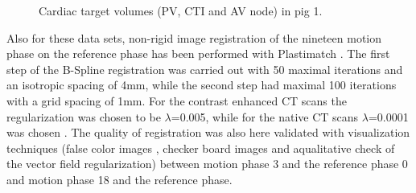 \newpage

 \begin{figure}[H]
 \begin{center}
\caption{Cardiac target volumes (PV, CTI and AV node) in pig 1. }
\label{pig1_targets}
 \end{center}
\end{figure}

\vspace*{-0.7cm}

Also for these data sets, non-rigid image registration of the nineteen motion phase on the reference phase has been performed with Plastimatch 
\cite{Sharp07, Shack10}. The first step of the B-Spline registration was carried out with 50 maximal iterations and an isotropic 
spacing of 4mm, while the second step had maximal 100 iterations with a grid spacing of 1mm. For the contrast enhanced CT scans the 
regularization was chosen to be $\lambda$=0.005, while for the native CT scans $\lambda$=0.0001 was chosen . 
The quality of registration was also here validated with visualization techniques (false color images \cite{Bro07}, checker board images 
\cite{Bro07} and aqualitative check of the vector field regularization) between motion phase 3 and the reference phase 0 and motion 
phase 18 and the reference phase.  


